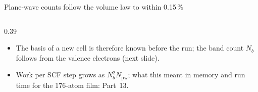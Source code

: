 \begin{frame}[t]{Plane-wave counts follow the volume law to within 0.15\,\%}
\begin{columns}[T,onlytextwidth]
\begin{column}{0.39\textwidth}
\begin{itemize}
          for the 1\,nm slab .
        \item The basis of a new cell is therefore known before the run; the band count $N_b$ follows from the
          valence electrons (next slide).
        \item Work per SCF step grows as $N_b^2N_{\mathrm{pw}}$; what this meant in memory and run time for the
          176-atom film: Part~13.
      \end{itemize}
    \end{column}
  \end{columns}
\end{frame}

